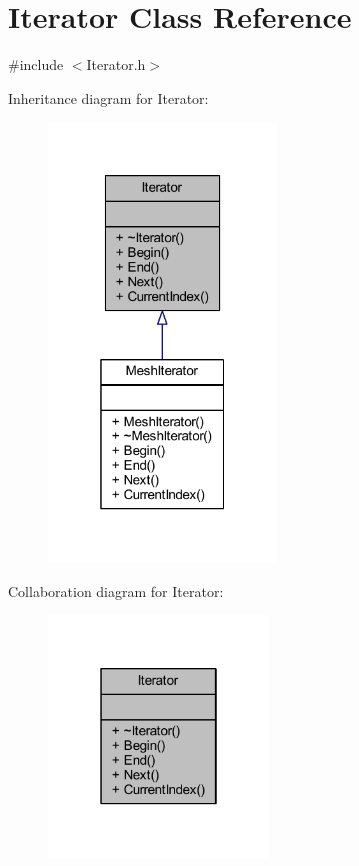 \hypertarget{class_iterator}{}\section{Iterator Class Reference}
\label{class_iterator}


{\ttfamily \#include $<$Iterator.\+h$>$}



Inheritance diagram for Iterator\+:
\nopagebreak
\begin{figure}[H]
\begin{center}
\leavevmode
\includegraphics[width=172pt]{class_iterator__inherit__graph}
\end{center}
\end{figure}


Collaboration diagram for Iterator\+:
\nopagebreak
\begin{figure}[H]
\begin{center}
\leavevmode
\includegraphics[width=166pt]{class_iterator__coll__graph}
\end{center}
\end{figure}
